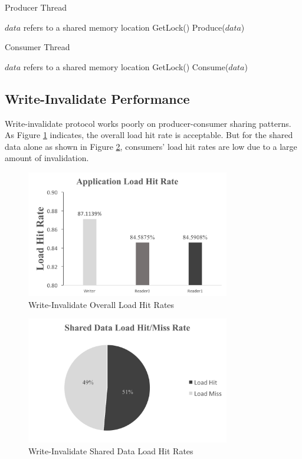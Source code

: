 \documentclass[conference]{IEEEtran}
\begin{document}
\begin{algorithm}
\caption{Producer Thread}
\label{producer_thread}
\begin{algorithmic}[1]
\State $data$ refers to a shared memory location
    \State GetLock() 
    \State Produce($data$)
\EndWhile
\end{algorithmic}
\end{algorithm}

\begin{algorithm}
\caption{Consumer Thread}
\label{consumer_thread}
\begin{algorithmic}[1]
\State $data$ refers to a shared memory location
    \State GetLock() 
    \State Consume($data$)
\EndWhile
\end{algorithmic}
\end{algorithm}


\subsection{Write-Invalidate Performance}
Write-invalidate protocol works poorly on producer-consumer sharing patterns. As Figure \ref{write_invalidate} indicates, the overall load hit rate is acceptable. But for the shared data alone as shown in Figure \ref{write_invalidate_1}, consumers' load hit rates are low due to a large amount of invalidation.

\begin{figure}[!h]
\centering
\includegraphics[width=3.5in]{write_invalidate.png}
\caption{Write-Invalidate Overall Load Hit Rates}
\label{write_invalidate}
\end{figure}
\FloatBarrier

\begin{figure}[!h]
\centering
\includegraphics[width=3.5in]{write_invalidate_1.png}
\caption{Write-Invalidate Shared Data Load Hit Rates}
\label{write_invalidate_1}
\end{figure}
\FloatBarrier
\end{document}
